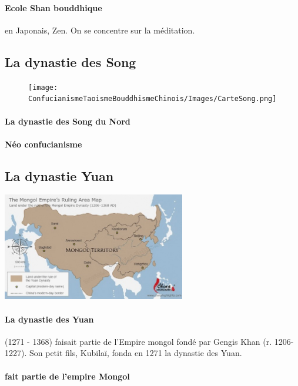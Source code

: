 \paragraph{Ecole Shan bouddhique} en Japonais, Zen. On se concentre sur la méditation.


\subsection{La dynastie des Song}
\begin{figure}
    \centering
    \texttt{[image: ConfucianismeTaoismeBouddhismeChinois/Images/CarteSong.png]}

    \label{fig:enter-label}
\end{figure}
\paragraph{La dynastie des Song du Nord}
 
\paragraph{Néo confucianisme}

\subsection{La dynastie Yuan} 

\includegraphics[width=0.6\textwidth]{ConfucianismeTaoismeBouddhismeChinois/Images/CarteYuan.jpg}
\paragraph{La dynastie des Yuan}  (1271 - 1368) faisait partie de l’Empire mongol fondé par Gengis Khan (r. 1206- 1227). Son petit fils, Kubilaï, fonda en 1271 la dynastie des Yuan.

\paragraph{fait partie de l'empire Mongol}

